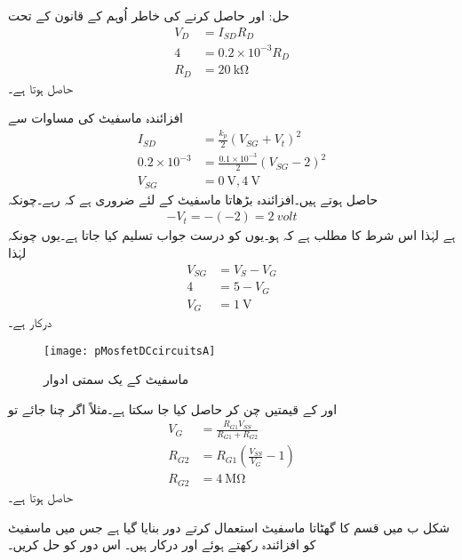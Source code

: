حل: اور  حاصل کرنے کی خاطر اُوہم کے قانون کے تحت
\begin{align*}
V_D&=I_{SD}R_D\\
4&=0.2 \times 10^{-3}R_D\\
R_D&=\SI{20}{\kilo \ohm}
\end{align*}
حاصل ہوتا ہے۔

افزائندہ ماسفیٹ کی مساوات سے
\begin{align*}
I_{SD}&=\frac{k_p}{2} \left(V_{SG}+V_t \right )^{2}\\
0.2 \times 10^{-3}&=\frac{0.1 \times 10^{-3}}{2} \left(V_{SG}-2 \right )^2 \\
V_{SG}&=\SI{0}{\volt}, \SI{4}{\volt}
\end{align*}
حاصل ہوتے ہیں۔افزائندہ  بڑھاتا ماسفیٹ کے لئے ضروری ہے کہ  رہے۔چونکہ
\begin{align*}
-V_t=-\left(-2 \right)=\SI{2}{volt}
\end{align*}
ہے لہٰذا اس شرط کا مطلب ہے کہ  ہو۔یوں   کو درست جواب تسلیم کیا جاتا ہے۔یوں چونکہ  لہٰذا
\begin{align*}
V_{SG}&=V_S-V_G\\
4&=5-V_G\\
V_G&=\SI{1}{\volt}
\end{align*}
درکار ہے۔
\begin{figure}
\centering
\texttt{[image: pMosfetDCcircuitsA]}
\caption{ ماسفیٹ کے یک سمتی ادوار}
\label{شکل_جمع_ماسفیٹ_کے_یک_سمتی_ادوار_الف}
\end{figure}
 اور  کے قیمتیں چن کر   حاصل کیا جا سکتا ہے۔مثلاً اگر  چنا جائے تو
\begin{align*}
V_G&=\frac{R_{G1} V_{SS}}{R_{G1}+R_{G2}}\\
R_{G2}&=R_{G1} \left(\frac{V_{SS}}{V_G}-1 \right )\\
R_{G2}&=\SI{4}{\mega \ohm}
\end{align*}
حاصل ہوتا ہے۔

شکل  ب میں  قسم کا گھٹاتا ماسفیٹ استعمال کرتے دور بنایا گیا ہے جس میں ماسفیٹ کو افزائندہ رکھتے ہوئے   اور
   درکار ہیں۔ اس دور کو حل کریں۔

